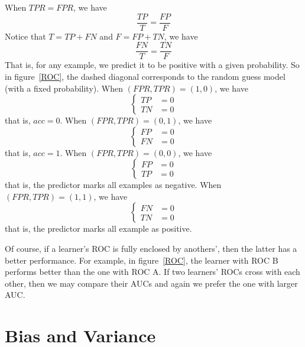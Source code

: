When $TPR = FPR$, we have 
$$\frac{TP}{T} = \frac{FP}{F}$$
Notice that $T = TP + FN$ and $F = FP + TN$, we have
$$\frac{FN}{T} = \frac{TN}{F}$$
That is, for any example, we predict it to be positive with a given probability. So in figure~\ref{ROC}, the
dashed diagonal corresponds to the random guess model (with a fixed probability). When $(FPR, TPR) = (1, 0)$,
we have 
\begin{equation*}
    \begin{cases}
        TP &= 0\\
        TN &= 0
    \end{cases}
\end{equation*}
that is, $acc = 0$. When $(FPR, TPR) = (0, 1)$, we have
\begin{equation*}
    \begin{cases}
        FP &= 0\\
        FN &= 0
    \end{cases}
\end{equation*}
that is, $acc = 1$. When $(FPR, TPR) = (0, 0)$, we have
\begin{equation*}
    \begin{cases}
        FP &= 0\\
        TP &= 0
    \end{cases}
\end{equation*}
that is, the predictor marks all examples as negative. When $(FPR, TPR) = (1, 1)$, we have
\begin{equation*}
    \begin{cases}
        FN &= 0\\
        TN &= 0
    \end{cases}
\end{equation*}
that is, the predictor marks all example as positive.

Of course, if a learner's ROC is fully enclosed by anothers', then the latter has a better performance. 
For example, in figure~\ref{ROC}, the learner with ROC B performs better than the one with ROC A.
If two learners' ROCs cross with each other, then we may compare their AUCs and again we prefer the one with
larger AUC\@.
\section{Bias and Variance}